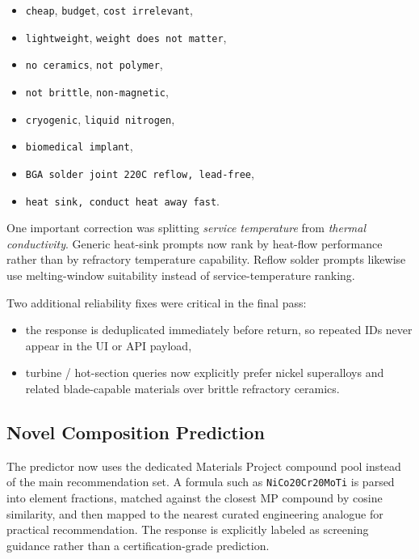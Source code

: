 \documentclass[11pt,a4paper]{article}
\begin{document}
\begin{itemize}[leftmargin=*]
  \item \texttt{cheap}, \texttt{budget}, \texttt{cost irrelevant},
  \item \texttt{lightweight}, \texttt{weight does not matter},
  \item \texttt{no ceramics}, \texttt{not polymer},
  \item \texttt{not brittle}, \texttt{non-magnetic},
  \item \texttt{cryogenic}, \texttt{liquid nitrogen},
  \item \texttt{biomedical implant},
  \item \texttt{BGA solder joint 220C reflow, lead-free},
  \item \texttt{heat sink, conduct heat away fast}.
\end{itemize}

One important correction was splitting \emph{service temperature} from \emph{thermal conductivity}. Generic heat-sink prompts now rank by heat-flow performance rather than by refractory temperature capability. Reflow solder prompts likewise use melting-window suitability instead of service-temperature ranking.

Two additional reliability fixes were critical in the final pass:

\begin{itemize}[leftmargin=*]
  \item the response is deduplicated immediately before return, so repeated IDs never appear in the UI or API payload,
  \item turbine / hot-section queries now explicitly prefer nickel superalloys and related blade-capable materials over brittle refractory ceramics.
\end{itemize}

\subsection{Novel Composition Prediction}

The predictor now uses the dedicated Materials Project compound pool instead of the main recommendation set. A formula such as \texttt{NiCo20Cr20MoTi} is parsed into element fractions, matched against the closest MP compound by cosine similarity, and then mapped to the nearest curated engineering analogue for practical recommendation. The response is explicitly labeled as screening guidance rather than a certification-grade prediction.
\end{document}
